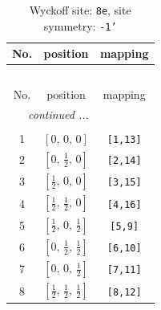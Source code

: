 \documentclass[fleqn,8pt]{jsarticle}
\begin{document}
\renewcommand{\arraystretch}{1.2}
\begin{longtable}{ccc}
\caption{Wyckoff site: {\tt 8e}, site symmetry: {\tt -1'}}
 \\
 \hline \hline
No. & position & mapping \\ \hline \endfirsthead

\multicolumn{2}{l}{\tablename\ \thetable{}} \\
 \hline \hline
No. & position & mapping \\ \hline \endhead

 \hline \hline
\multicolumn{2}{r}{\footnotesize\it continued ...} \\ \endfoot

 \hline \hline
\multicolumn{2}{r}{} \\ \endlastfoot

1 & $\left[ 0,\, 0,\, 0 \right]$ & {\tt [1,13]} \\ \hline
2 & $\left[ 0,\, \frac{1}{2},\, 0 \right]$ & {\tt [2,14]} \\ \hline
3 & $\left[ \frac{1}{2},\, 0,\, 0 \right]$ & {\tt [3,15]} \\ \hline
4 & $\left[ \frac{1}{2},\, \frac{1}{2},\, 0 \right]$ & {\tt [4,16]} \\ \hline
5 & $\left[ \frac{1}{2},\, 0,\, \frac{1}{2} \right]$ & {\tt [5,9]} \\ \hline
6 & $\left[ 0,\, \frac{1}{2},\, \frac{1}{2} \right]$ & {\tt [6,10]} \\ \hline
7 & $\left[ 0,\, 0,\, \frac{1}{2} \right]$ & {\tt [7,11]} \\ \hline
8 & $\left[ \frac{1}{2},\, \frac{1}{2},\, \frac{1}{2} \right]$ & {\tt [8,12]} \\
\end{longtable}
\renewcommand{\arraystretch}{1.2}
\end{document}
